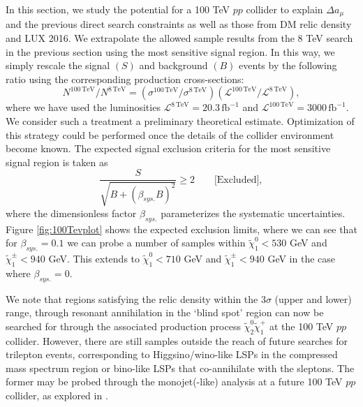 In this section, we study the potential for a 100 TeV $pp$ collider to explain $\Delta a_{\mu}$ and the previous direct search constraints as well as those from DM relic density and LUX 2016. We extrapolate the allowed sample results from the 8 TeV search in the previous section using the most sensitive signal region. In this way, we simply rescale the signal $(S)$ and background $(B)$ events by the following ratio using the corresponding production cross-sections:
\begin{equation}
N^{100\,\text{TeV}}/N^{8\,\text{TeV}}=(\sigma^{100\,\text{TeV}}/\sigma^{8\,\text{TeV}})(\mathcal{L}^{100\,\text{TeV}}/\mathcal{L}^{8\,\text{TeV}}),
\end{equation}
where we have used the luminosities $\mathcal{L}^{8\,\text{TeV}}=20.3\,\text{fb}^{-1}$ and $\mathcal{L}^{100\,\text{TeV}}=3000\,\text{fb}^{-1}$. We consider such a treatment a preliminary theoretical estimate. Optimization of this strategy could be performed once the details of the collider environment become known. The expected signal exclusion criteria for the most sensitive signal region is taken as
\begin{equation}
\frac{S}{\sqrt{B+(\beta_{sys.}B)^2}} \geq 2 \qquad \text{[Excluded]},
\end{equation}
where the dimensionless factor $\beta_{sys.}$ parameterizes the systematic uncertainties. Figure \ref{fig:100Tevplot} shows the expected exclusion limits, where we can see that for $\beta_{sys.}=0.1$ we can probe a number of samples within $\tilde{\chi}^0_1 < 530$ GeV and $\tilde{\chi}^{\pm}_1 < 940$ GeV. This extends to $\tilde{\chi}^0_1 < 710$ GeV and $\tilde{\chi}^{\pm}_1 < 940$ GeV in the case where $\beta_{sys.}=0$.

We note that regions satisfying the relic density within the $3\sigma$ (upper and lower) range, through resonant annihilation in the `blind spot' region can now be searched for through the associated production process $\tilde{\chi}^0_2 \tilde{\chi}^+_1$ at the 100 TeV $pp$ collider. However, there are still samples outside the reach of future searches for trilepton events, corresponding to Higgsino/wino-like LSPs in the compressed mass spectrum region or bino-like LSPs that co-annihilate with the sleptons. The former may be probed through the monojet(-like) analysis at a future 100 TeV $pp$ collider, as explored in \cite{RN196}.


